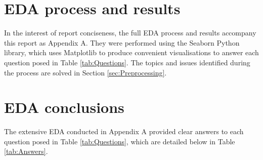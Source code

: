 \documentclass[12pt]{report}
\begin{document}
\section{EDA process and results}
In the interest of report conciseness, the full EDA process and results accompany this report as Appendix A. They were performed using the Seaborn Python library,
which uses Matplotlib to produce convenient visualisations to answer each question posed in Table \ref{tab:Questions}. The topics and issues identified
during the process are solved in Section \ref{sec:Preprocessing}.


\section{EDA conclusions}
The extensive EDA conducted in Appendix A provided clear answers to each question posed in Table \ref{tab:Questions}, 
which are detailed below in Table \ref{tab:Answers}.
\end{document}
